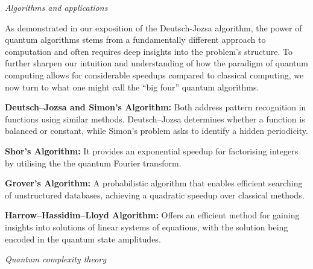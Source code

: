 \documentclass[a4paper,oneside, 12pt]{amsart}
\begin{document}
\begin{center}
  \textit{Algorithms and applications}
\end{center}
\bigskip

As demonstrated in our exposition of the Deutsch-Jozsa algorithm, the power of quantum algorithms stems from a fundamentally different approach to computation and often requires deep insights into the problem’s structure.
To further sharpen our intuition and understanding of how the paradigm of quantum computing allows for considerable speedups compared to classical computing, we now turn to what one might call the ``big four'' quantum algorithms.

\begin{thmlist}
  \item \textbf{Deutsch--Jozsa and Simon's Algorithm:} Both address pattern recognition in functions using similar methods.
  Deutsch--Jozsa determines whether a function is balanced or constant,
  while Simon's problem asks to identify a hidden periodicity.

  \item \textbf{Shor's Algorithm:} It provides an exponential speedup for factorising integers by utilising the  the quantum Fourier transform.

  \item \textbf{Grover's Algorithm:} A probabilistic algorithm that enables efficient searching of unstructured databases, achieving a quadratic speedup over classical methods.

  \item \textbf{Harrow--Hassidim--Lloyd Algorithm:}
  Offers an efficient method for gaining insights into solutions of linear systems of equations, with the solution being encoded in the quantum state amplitudes.
\end{thmlist}
\bigskip

\begin{center}
  \textit{Quantum complexity theory}
\end{center}
\bigskip
\end{document}
